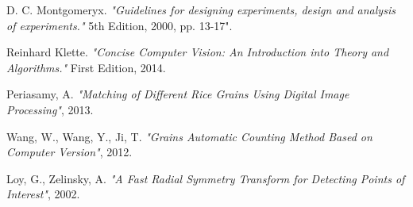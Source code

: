\begin{thebibliography}{9}
D. C. Montgomeryx.
\textit{"Guidelines for designing experiments, design and analysis of experiments."} 5th Edition, 2000, pp. 13-17".

Reinhard Klette.
\textit{"Concise Computer Vision: An Introduction into Theory and Algorithms."} First Edition, 2014.

Periasamy, A. 
\textit{"Matching of Different Rice Grains Using Digital Image Processing"}, 2013.

Wang, W., Wang, Y., Ji, T. \textit{"Grains Automatic Counting Method Based on Computer Version"}, 2012.

Loy, G., Zelinsky, A. \textit{"A Fast Radial Symmetry Transform for Detecting Points of Interest"}, 2002.

\end{thebibliography}